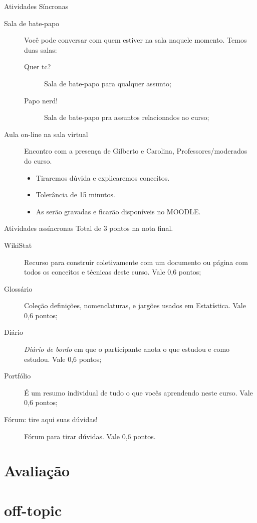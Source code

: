 \documentclass[9pt]{beamer}
\begin{document}
\begin{frame}{}

\small
\begin{block}{Atividades Síncronas}
	\begin{description}
		\item[Sala de bate-papo] Você pode conversar com quem estiver na sala naquele momento. Temos duas salas:
		\begin{description}
			\item[Quer tc?] Sala de bate-papo para qualquer assunto;
			\item[Papo nerd!] Sala de bate-papo pra assuntos relacionados ao curso;
		\end{description}
		\item[Aula on-line na sala virtual] Encontro com a presença de Gilberto e Carolina, Professores/moderados do curso.
		\begin{itemize}
			\item Tiraremos dúvida e explicaremos conceitos.
			\item Tolerância de 15 minutos.
			\item As serão gravadas e ficarão disponíveis no MOODLE.
		\end{itemize}  
	\end{description}
\end{block}
\vfill

\begin{block}{Atividades assíncronas}
	Total de 3 pontos na nota final.
	\begin{description}
		\item[WikiStat] Recurso para construir coletivamente com um documento ou página com todos os conceitos e técnicas deste curso. Vale 0,6 pontos;
		\item[Glossário] Coleção definições, nomenclaturas, e jargões usados em Estatística. Vale 0,6 pontos;
		\item[Diário] \textit{Diário de bordo} em que o participante anota o que estudou e como estudou. Vale 0,6 pontos;
		\item[Portfólio] É um resumo individual de tudo o que vocês aprendendo neste curso. Vale 0,6 pontos;
		\item[Fórum: tire aqui suas dúvidas!] Fórum para tirar dúvidas. Vale 0,6 pontos.
	\end{description}
\end{block}

\normalsize
\end{frame}

\section{Avaliação}

\section{off-topic}

\section{}
\end{document}
